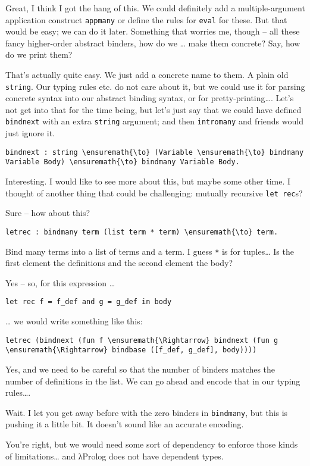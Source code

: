 \heroSTUDENT{} Great, I think I got the hang of this. We could definitely add
a multiple-argument application construct \texttt{appmany} or define the
rules for \texttt{eval} for these. But that would be easy; we can do it
later. Something that worries me, though -- all these fancy higher-order
abstract binders, how do we \ldots{} make them concrete? Say, how do we
print them?

\heroADVISOR{} That's actually quite easy. We just add a concrete name to
them. A plain old \texttt{string}. Our typing rules etc. do not care
about it, but we could use it for parsing concrete syntax into our
abstract binding syntax, or for pretty-printing\ldots{}. Let's not get
into that for the time being, but let's just say that we could have
defined \texttt{bindnext} with an extra \texttt{string} argument; and
then \texttt{intromany} and friends would just ignore it.

\begin{verbatim}
bindnext : string \ensuremath{\to} (Variable \ensuremath{\to} bindmany Variable Body) \ensuremath{\to} bindmany Variable Body.
\end{verbatim}

\heroSTUDENT{} Interesting. I would like to see more about this, but maybe
some other time. I thought of another thing that could be challenging:
mutually recursive \texttt{let\ rec}s?

\heroADVISOR{} Sure -- how about this?

\begin{verbatim}
letrec : bindmany term (list term * term) \ensuremath{\to} term.
\end{verbatim}

\heroSTUDENT{} Bind many terms into a list of terms and a term. I guess
\texttt{*} is for tuples\ldots{} Is the first element the definitions
and the second element the body?

\heroADVISOR{} Yes -- so, for this expression \ldots{}

\begin{verbatim}
let rec f = f_def and g = g_def in body
\end{verbatim}

\heroSTUDENT{} \ldots{} we would write something like this:

\begin{verbatim}
letrec (bindnext (fun f \ensuremath{\Rightarrow} bindnext (fun g \ensuremath{\Rightarrow} bindbase ([f_def, g_def], body))))
\end{verbatim}

\heroADVISOR{} Yes, and we need to be careful so that the number of binders
matches the number of definitions in the list. We can go ahead and
encode that in our typing rules\ldots{}.

\heroSTUDENT{} Wait. I let you get away before with the zero binders in
\texttt{bindmany}, but this is pushing it a little bit. It doesn't sound
like an accurate encoding.

\heroADVISOR{} You're right, but we would need some sort of dependency to
enforce those kinds of limitations\ldots{} and \foreignlanguage{greek}{λ}Prolog does not have
dependent types.
